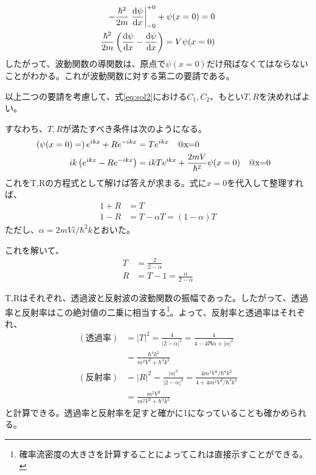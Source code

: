 \documentclass[uplatex,dvipdfmx]{jsarticle}
\begin{document}
\begin{align}
    -\frac{\hbar^2}{2m} \eval{\dv{\psi}{x}}_{-0}^{+0} + \psi(x=0) = 0 \\
    \frac{\hbar^2}{2m} \left(\dv{\psi}{x} (x=+0)-\dv{\psi}{x} (x=-0)\right) = V\psi(x=0)
\end{align}
したがって、波動関数の導関数は、原点で$\psi(x=0)$だけ飛ばなくてはならないことがわかる。これが波動関数に対する第二の要請である。


以上二つの要請を考慮して、式\ref{eq:sol2}における$C_1,C_2$、もとい$T,R$を決めればよい。

すなわち、$T,R$が満たすべき条件は次のようになる。
\begin{align}
    \left(\psi(x=0) =\right) e^{ikx} + R e^{-ikx} &= T e^{ikx} \qq{@x=0} \\
    ik\left(e^{ikx} - R e^{-ikx} \right) &= ikT e^{ikx}+\frac{2mV}{\hbar^2}\psi(x=0) \qq{@x=0}
\end{align}
これをT,Rの方程式として解けば答えが求まる。式に$x=0$を代入して整理すれば、
\begin{align}
    1 + R &= T \\
    1 - R &= T - \alpha T = (1-\alpha)T   
\end{align}
ただし、$\alpha = 2mVi/\hbar^2k$とおいた。

これを解いて、
\begin{align}
    T &= \frac{2}{2-\alpha} \\
    R &= T-1 = \frac{\alpha}{2-\alpha}
\end{align}

T,Rはそれぞれ、透過波と反射波の波動関数の振幅であった。したがって、透過率と反射率はこの絶対値の二乗に相当する\footnote{確率流密度の大きさを計算することによってこれは直接示すことができる。}。よって、反射率と透過率はそれぞれ、
\begin{align}
    (透過率) &= |T|^2 = \frac{4}{|2-\alpha|^2}
    = \frac{4}{4-4\Re{\alpha}+|\alpha|^2}\\
    &= \frac{\hbar^4k^2}{m^2V^2+\hbar^4k^2} \\
    (反射率) &= |R|^2 = \frac{|\alpha|^2}{|2-\alpha|^2} = \frac{4m^2V^2/\hbar^4k^2}{4+4m^2V^2/\hbar^4k^2} \\
    &= \frac{m^2V^2}{m^2V^2+\hbar^4k^2}    
\end{align}
と計算できる。透過率と反射率を足すと確かに1になっていることも確かめられる。
\end{document}
